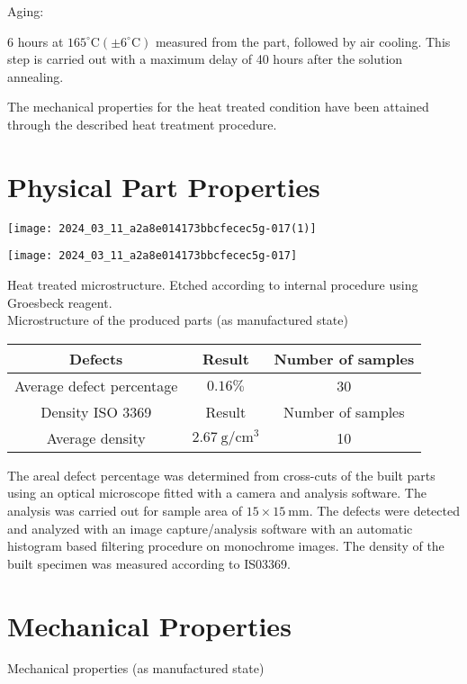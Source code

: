 \documentclass[10pt]{article}
\begin{document}
Aging:

6 hours at $165^{\circ} \mathrm{C}\left( \pm 6^{\circ} \mathrm{C}\right)$ measured from the part, followed by air cooling. This step is carried out with a maximum delay of 40 hours after the solution annealing.

The mechanical properties for the heat treated condition have been attained through the described heat treatment procedure.

\section*{Physical Part Properties}
\begin{center}
\texttt{[image: 2024\_03\_11\_a2a8e014173bbcfecec5g-017(1)]}
\end{center}

\begin{center}
\texttt{[image: 2024\_03\_11\_a2a8e014173bbcfecec5g-017]}
\end{center}

Heat treated microstructure. Etched according to internal procedure using Groesbeck reagent.\\
Microstructure of the produced parts (as manufactured state)

\begin{center}
\begin{tabular}{|c|c|c|}
\hline
Defects & Result & Number of samples \\
\hline
Average defect percentage & $0.16 \%$ & 30 \\
\hline
Density ISO 3369 & Result & Number of samples \\
\hline
Average density & $2.67 \mathrm{~g} / \mathrm{cm}^{3}$ & 10 \\
\hline
\end{tabular}
\end{center}

The areal defect percentage was determined from cross-cuts of the built parts using an optical microscope fitted with a camera and analysis software. The analysis was carried out for sample area of $15 \times 15 \mathrm{~mm}$. The defects were detected and analyzed with an image capture/analysis software with an automatic histogram based filtering procedure on monochrome images. The density of the built specimen was measured according to IS03369.

\section*{Mechanical Properties}
Mechanical properties (as manufactured state)
\end{document}
